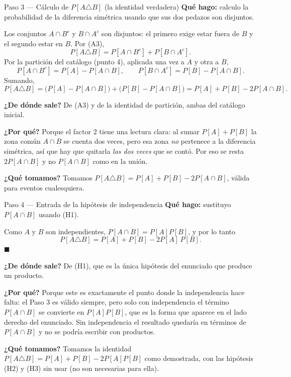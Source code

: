 \documentclass[11pt]{article}
\begin{document}
\begin{sol}
\begin{paso}{Paso 3 --- C\'alculo de $P[A\triangle B]$ (la identidad verdadera)}
\textbf{Qu\'e hago:} calculo la probabilidad de la diferencia sim\'etrica usando que sus dos pedazos son disjuntos.

Los conjuntos $A\cap B^{c}$ y $B\cap A^{c}$ son disjuntos: el primero exige estar fuera de $B$ y el segundo estar en $B$. Por (A3),
\[
P[A\triangle B]=P[A\cap B^{c}]+P[B\cap A^{c}].
\]
Por la partici\'on del cat\'alogo (punto 4), aplicada una vez a $A$ y otra a $B$,
\[
P[A\cap B^{c}]=P[A]-P[A\cap B],
\qquad
P[B\cap A^{c}]=P[B]-P[A\cap B].
\]
Sumando,
\[
P[A\triangle B]=\bigl(P[A]-P[A\cap B]\bigr)+\bigl(P[B]-P[A\cap B]\bigr)=P[A]+P[B]-2P[A\cap B].
\]

\textbf{¿De d\'onde sale?} De (A3) y de la identidad de partici\'on, ambas del cat\'alogo inicial.

\textbf{¿Por qu\'e?} Porque el factor $2$ tiene una lectura clara: al sumar $P[A]+P[B]$ la zona com\'un $A\cap B$ se cuenta dos veces, pero esa zona \emph{no} pertenece a la diferencia sim\'etrica, as\'i que hay que quitarla \emph{las dos veces} que se cont\'o. Por eso se resta $2P[A\cap B]$ y no $P[A\cap B]$ como en la uni\'on.

\textbf{¿Qu\'e tomamos?} Tomamos $P[A\triangle B]=P[A]+P[B]-2P[A\cap B]$, v\'alida para eventos cualesquiera.
\end{paso}

\begin{paso}{Paso 4 --- Entrada de la hip\'otesis de independencia}
\textbf{Qu\'e hago:} sustituyo $P[A\cap B]$ usando (H1).

Como $A$ y $B$ son independientes, $P[A\cap B]=P[A]P[B]$, y por lo tanto
\[
P[A\triangle B]=P[A]+P[B]-2P[A]\,P[B].
\]
$\blacksquare$

\textbf{¿De d\'onde sale?} De (H1), que es la \'unica hip\'otesis del enunciado que produce un producto.

\textbf{¿Por qu\'e?} Porque este es exactamente el punto donde la independencia hace falta: el Paso 3 es v\'alido siempre, pero solo con independencia el t\'ermino $P[A\cap B]$ se convierte en $P[A]P[B]$, que es la forma que aparece en el lado derecho del enunciado. Sin independencia el resultado quedar\'ia en t\'erminos de $P[A\cap B]$ y no se podr\'ia escribir con productos.

\textbf{¿Qu\'e tomamos?} Tomamos la identidad $P[A\triangle B]=P[A]+P[B]-2P[A]P[B]$ como demostrada, con las hip\'otesis (H2) y (H3) sin usar (no son necesarias para ella).
\end{paso}

\end{sol}
\end{document}
